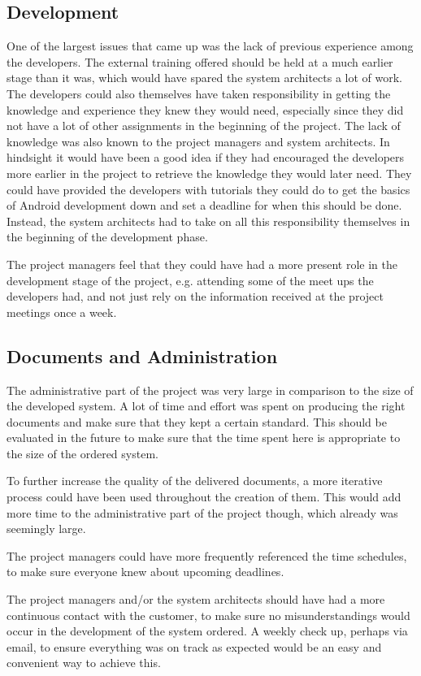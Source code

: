 \documentclass[a4paper]{article}
\begin{document}
\subsection{Development}
One of the largest issues that came up was the lack of previous experience among the developers. The external training offered should be held at a much earlier stage than it was, which would have spared the system architects a lot of work. The developers could also themselves have taken responsibility in getting the knowledge and experience they knew they would need, especially since they did not have a lot of other assignments in the beginning of the project. The lack of knowledge was also known to the project managers and system architects. In hindsight it would have been a good idea if they had encouraged the developers more earlier in the project to retrieve the knowledge they would later need. They could have provided the developers with tutorials they could do to get the basics of Android development down and set a deadline for when this should be done. Instead, the system architects had to take on all this responsibility themselves in the beginning of the development phase. 

The project managers feel that they could have had a more present role in the development stage of the project, e.g. attending some of the meet ups the developers had, and not just rely on the information received at the project meetings once a week. 

\subsection{Documents and Administration}
The administrative part of the project was very large in comparison to the size of the developed system. A lot of time and effort was spent on producing the right documents and make sure that they kept a certain standard. This should be evaluated in the future to make sure that the time spent here is appropriate to the size of the ordered system.

To further increase the quality of the delivered documents, a more iterative process could have been used throughout the creation of them. This would add more time to the administrative part of the project though, which already was seemingly large.

The project managers could have more frequently referenced the time schedules, to make sure everyone knew about upcoming deadlines.

The project managers and/or the system architects should have had a more continuous contact with the customer, to make sure no misunderstandings would occur in the development of the system ordered. A weekly check up, perhaps via email, to ensure everything was on track as expected would be an easy and convenient way to achieve this. 
\end{document}
